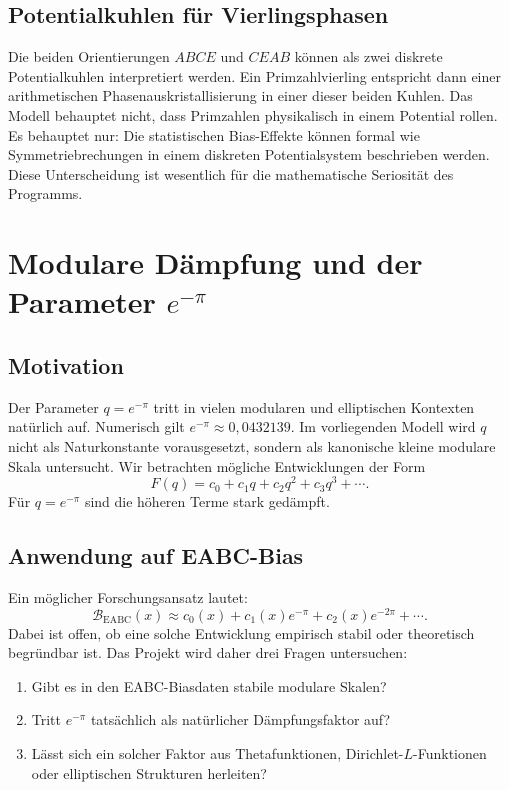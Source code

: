 \documentclass[11pt,a4paper,bibliography=totoc]{scrartcl}
\begin{document}
	\subsection{Potentialkuhlen für Vierlingsphasen}
	Die beiden Orientierungen $ABCE$ und $CEAB$ können als zwei diskrete Potentialkuhlen interpretiert werden. Ein Primzahlvierling entspricht dann einer arithmetischen Phasenauskristallisierung in einer dieser beiden Kuhlen. Das Modell behauptet nicht, dass Primzahlen physikalisch in einem Potential rollen. Es behauptet nur: Die statistischen Bias-Effekte können formal wie Symmetriebrechungen in einem diskreten Potentialsystem beschrieben werden. Diese Unterscheidung ist wesentlich für die mathematische Seriosität des Programms.
	
	\section{Modulare Dämpfung und der Parameter \texorpdfstring{$e^{-\pi}$}{e\textasciicircum(-\textbackslash pi)}}
	
	\subsection{Motivation}
	Der Parameter $q = e^{-\pi}$ tritt in vielen modularen und elliptischen Kontexten natürlich auf. Numerisch gilt $e^{-\pi} \approx 0{,}0432139$. Im vorliegenden Modell wird $q$ nicht als Naturkonstante vorausgesetzt, sondern als kanonische kleine modulare Skala untersucht. Wir betrachten mögliche Entwicklungen der Form
	\[
	F(q) = c_0 + c_1 q + c_2 q^2 + c_3 q^3 + \cdots.
	\]
	Für $q = e^{-\pi}$ sind die höheren Terme stark gedämpft.
	
	\subsection{Anwendung auf EABC-Bias}
	Ein möglicher Forschungsansatz lautet:
	\[
	\mathcal{B}_{\mathrm{EABC}}(x) \approx c_0(x) + c_1(x)e^{-\pi} + c_2(x)e^{-2\pi} + \cdots.
	\]
	Dabei ist offen, ob eine solche Entwicklung empirisch stabil oder theoretisch begründbar ist. Das Projekt wird daher drei Fragen untersuchen:
	\begin{enumerate}
		\item Gibt es in den EABC-Biasdaten stabile modulare Skalen?
		\item Tritt $e^{-\pi}$ tatsächlich als natürlicher Dämpfungsfaktor auf?
		\item Lässt sich ein solcher Faktor aus Thetafunktionen, Dirichlet-$L$-Funktionen oder elliptischen Strukturen herleiten?
	\end{enumerate}
	
\end{document}
